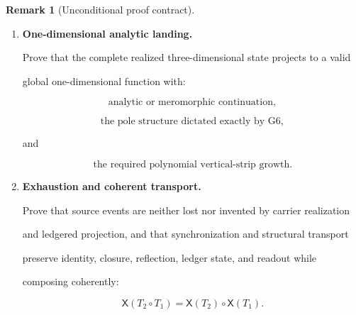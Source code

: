 \documentclass[11pt]{article}
\theoremstyle{definition}
\newtheorem{remark}[theorem]{Remark}
\begin{document}
\begin{remark}[Unconditional proof contract]
\begin{enumerate}
\begin{enumerate}
\[=

\mathfrak R\circ\Pi_{1D},

\]

where

\[

(\mathfrak Rf)(s)

=

\varepsilon_W f^\vee(\kappa-s).

\]

Hence

\[

\Lambda(s,W)

=

\varepsilon_W\Lambda(\kappa-s,W^\vee).

\]

\item[\textup{(G9)}] \textbf{One-dimensional analytic landing.}

Prove that the complete realized three-dimensional state projects to a valid

global one-dimensional function with:

\[

\text{analytic or meromorphic continuation},

\]

\[

\text{the pole structure dictated exactly by G6},

\]

and

\[

\text{the required polynomial vertical-strip growth}.

\]

\item[\textup{(G10)}] \textbf{Exhaustion and coherent transport.}

Prove that source events are neither lost nor invented by carrier realization

and ledgered projection, and that synchronization and structural transport

preserve identity, closure, reflection, ledger state, and readout while

composing coherently:

\[

\mathsf X(T_2\circ T_1)

=

\mathsf X(T_2)\circ\mathsf X(T_1).

\]

\end{enumerate}










\end{enumerate}
\end{remark}
\end{document}
